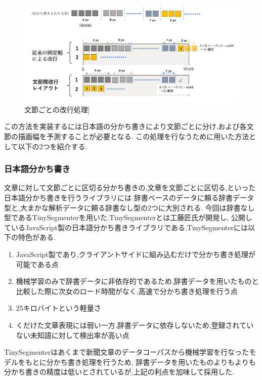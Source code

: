 \begin{figure}[H]
    \centering
    \label{fig:image14}
    \includegraphics[width=0.6\columnwidth]{image/03/img6.png}
	\caption[文節ごとの改行処理]{文節ごとの改行処理]}
\end{figure}

この方法を実装するには日本語の分かち書きにより文節ごとに分け,および各文節の描画幅を予測することが必要となる.
この処理を行なうために用いた方法として以下の2つを紹介する.

\subsubsection{日本語分かち書き}
文章に対して文節ごとに区切る分かち書きの,文章を文節ごとに区切る,といった日本語分かち書きを行うライブラリには
辞書ベースのデータに頼る辞書データ型と,大まかな解析データに頼る辞書なし型の2つに大別される.
今回は辞書なし型であるTinySegmenterを用いた.TinySegmenterとは工藤匠氏が開発し,
公開しているJavaScript製の日本語分かち書きライブラリである.\footnotemark[3]
TinySegmenterには以下の特色がある.

\begin{enumerate}
	\item JavaScript製であり,クライアントサイドに組み込むだけで分かち書き処理が可能である点
	\item 機械学習のみで辞書データに非依存的であるため,辞書データを用いたものと比較した際に次女のロード時間がなく,高速で分かち書き処理を行う点
	\item 25キロバイトという軽量さ
	\item くだけた文章表現には弱い一方,辞書データに依存しないため,登録されていない未知語に対して検出率が高い点
\end{enumerate}
TinySegmenterはあくまで新聞文章のデータコーパスから機械学習を行なったモデルをもとに分かち書き処理を行うため,
辞書データを用いたものよりもよりも分かち書きの精度は低いとされているが,上記の利点を加味して採用した.


